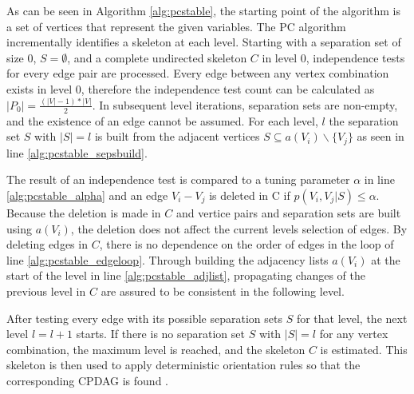As can be seen in Algorithm \ref{alg:pcstable}, the starting point of the algorithm is a set of vertices that represent the given variables. The PC algorithm incrementally identifies a skeleton at each level. Starting with a separation set of size 0, $S = \emptyset$, and a complete undirected skeleton $C$ in level 0, independence tests for every edge pair are processed. Every edge between any vertex combination exists in level 0, therefore the independence test count can be calculated as $|P_0| = \frac{(|V| - 1) * |V|}{2}$. In subsequent level iterations, separation sets are non-empty, and the existence of an edge cannot be assumed. For each level, $l$ the separation set $S$ with $|S| = l$ is built from the adjacent vertices $S \subseteq a(V_i ) \backslash \{V_j \}$ as seen in line \ref{alg:pcstable_sepsbuild}.

The result of an independence test is compared to a tuning parameter $\alpha$ in line \ref{alg:pcstable_alpha} and an edge $V_i - V_j$ is deleted in C if $p(V_i,V_j|S) \leq \alpha$. Because the deletion is made in $C$ and vertice pairs and separation sets are built using $a(V_i)$, the deletion does not affect the current levels selection of edges. By deleting edges in $C$, there is no dependence on the order of edges in the loop of line \ref{alg:pcstable_edgeloop}. Through building the adjacency lists $a(V_i)$ at the start of the level in line \ref{alg:pcstable_adjlist}, propagating changes of the previous level in $C$ are assured to be consistent in the following level.

After testing every edge with its possible separation sets $S$ for that level, the next level $l=l+1$ starts. If there is no separation set $S$ with $|S| = l$ for any vertex combination, the maximum level is reached, and the skeleton $C$ is estimated.
This skeleton is then used to apply deterministic orientation rules so that the corresponding CPDAG is found \cite{colomboOrderIndependentConstraintBasedCausal2014,kalischEstimatingHighDimensionalDirected2007,pearlIntroductionCausalInference2010,schmidtOrderIndependentConstraintBasedCausal2018}.
